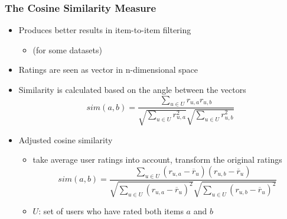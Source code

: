 \documentclass{beamer}
\begin{document}
\begin{frame}
    \frametitle{The Cosine Similarity Measure}
    \begin{itemize}
    \item  Produces better results in item-to-item filtering
        \begin{itemize}
        \item (for some datasets)
        \end{itemize}
    \item Ratings are seen as vector in n-dimensional space
    \item Similarity is calculated based on the angle between the vectors
        \begin{displaymath}
                sim(a,b) = \frac{\sum_{u \in U}r_{u,a}r_{u,b}}{\sqrt{\sum_{u \in U}r_{u,a}^2}\sqrt{\sum_{u \in U}r_{u,b}^2}}
        \end{displaymath}
    \item Adjusted cosine similarity
        \begin{itemize}
        \item take average user ratings into account, transform the original
            ratings
            \begin{displaymath}
                sim(a,b) = \frac{\sum_{u \in U}(r_{u,a}-\overline{r}_u)(r_{u,b}-\overline{r}_u)}{\sqrt{\sum_{u \in U}(r_{u,a}-\overline{r}_u)^2}\sqrt{\sum_{u \in U}(r_{u,b}-\overline{r}_u)^2}}
            \end{displaymath}
        \item $U$: set of users who have rated both items $a$ and $b$
        \end{itemize}
    \end{itemize}
\end{frame}
\end{document}
